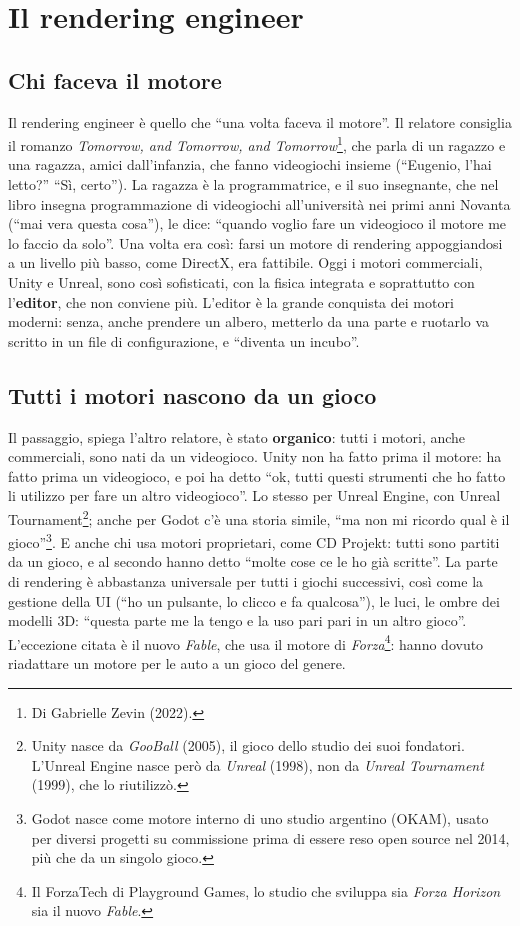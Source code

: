 \section{Il rendering engineer}
\label{p5:sec:rendering}

\subsection{Chi faceva il motore}

Il rendering engineer è quello che ``una volta faceva il motore''. Il relatore
consiglia il romanzo \emph{Tomorrow, and Tomorrow, and Tomorrow}\footnote{Di
Gabrielle Zevin (2022).}, che parla di un ragazzo e una ragazza, amici
dall'infanzia, che fanno videogiochi insieme (``Eugenio, l'hai letto?'' ``Sì,
certo''). La ragazza è la programmatrice, e il suo insegnante, che nel libro
insegna programmazione di videogiochi all'università nei primi anni Novanta
(``mai vera questa cosa''), le dice: ``quando voglio fare un videogioco il
motore me lo faccio da solo''. Una volta era così: farsi un motore di rendering
appoggiandosi a un livello più basso, come DirectX, era fattibile. Oggi i
motori commerciali, Unity e Unreal, sono così sofisticati, con la fisica
integrata e soprattutto con l'\textbf{editor}, che non conviene più. L'editor
è la grande conquista dei motori moderni: senza, anche prendere un albero,
metterlo da una parte e ruotarlo va scritto in un file di configurazione, e
``diventa un incubo''.

\subsection{Tutti i motori nascono da un gioco}

Il passaggio, spiega l'altro relatore, è stato \textbf{organico}: tutti i
motori, anche commerciali, sono nati da un videogioco. Unity non ha fatto
prima il motore: ha fatto prima un videogioco, e poi ha detto ``ok, tutti
questi strumenti che ho fatto li utilizzo per fare un altro videogioco''. Lo
stesso per Unreal Engine, con Unreal Tournament\footnote{Unity nasce da
\emph{GooBall} (2005), il gioco dello studio dei suoi fondatori. L'Unreal
Engine nasce però da \emph{Unreal} (1998), non da \emph{Unreal Tournament}
(1999), che lo riutilizzò.}; anche per Godot c'è una storia simile, ``ma non mi
ricordo qual è il gioco''\footnote{Godot nasce come motore interno di uno
studio argentino (OKAM), usato per diversi progetti su commissione prima di
essere reso open source nel 2014, più che da un singolo gioco.}. E anche chi
usa motori proprietari, come CD Projekt: tutti sono partiti da un gioco, e al
secondo hanno detto ``molte cose ce le ho già scritte''. La parte di rendering
è abbastanza universale per tutti i giochi successivi, così come la gestione
della UI (``ho un pulsante, lo clicco e fa qualcosa''), le luci, le ombre dei
modelli 3D: ``questa parte me la tengo e la uso pari pari in un altro gioco''.
L'eccezione citata è il nuovo \emph{Fable}, che usa il motore di
\emph{Forza}\footnote{Il ForzaTech di Playground Games, lo studio che sviluppa
sia \emph{Forza Horizon} sia il nuovo \emph{Fable}.}: hanno dovuto riadattare
un motore per le auto a un gioco del genere.

